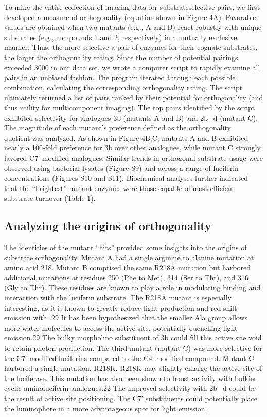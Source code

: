To mine the entire collection of imaging data for substrateselective
pairs, we first developed a measure of orthogonality
(equation shown in Figure 4A). Favorable values are obtained
when two mutants (e.g., A and B) react robustly with unique
substrates (e.g., compounds 1 and 2, respectively) in a mutually
exclusive manner. Thus, the more selective a pair of enzymes
for their cognate substrates, the larger the orthogonality rating.
Since the number of potential pairings exceeded 3000 in our
data set, we wrote a computer script to rapidly examine all pairs
in an unbiased fashion. The program iterated through each
possible combination, calculating the corresponding orthogonality
rating. The script ultimately returned a list of pairs ranked
by their potential for orthogonality (and thus utility for
multicomponent imaging).
The top pairs identified by the script exhibited selectivity for
analogues 3b (mutants A and B) and 2b−d (mutant C). The
magnitude of each mutant’s preferencedefined as the
orthogonality quotientwas analyzed. As shown in Figure
4B,C, mutants A and B exhibited nearly a 100-fold preference for 3b over other analogues, while mutant C strongly favored
C7′-modified analogues. Similar trends in orthogonal substrate
usage were observed using bacterial lysates (Figure S9) and
across a range of luciferin concentrations (Figures S10 and
S11). Biochemical analyses further indicated that the “brightest”
mutant enzymes were those capable of most efficient substrate
turnover (Table 1).

\subsection*{Analyzing the origins of orthogonality}

The identities
of the mutant “hits” provided some insights into the origins of
substrate orthogonality. Mutant A had a single arginine to
alanine mutation at amino acid 218. Mutant B comprised the
same R218A mutation but harbored additional mutations at
residues 250 (Phe to Met), 314 (Ser to Thr), and 316 (Gly to
Thr). These residues are known to play a role in modulating
binding and interaction with the luciferin substrate. The R218A
mutant is especially interesting, as it is known to greatly reduce
light production and red shift emission with \dluciferin{}.29 It has
been hypothesized that the smaller Ala group allows more
water molecules to access the active site, potentially quenching
light emission.29 The bulky morpholino substituent of 3b could
fill this active site void to retain photon production. The third
mutant (mutant C) was more selective for the C7′-modified
luciferins compared to the C4′-modified compound. Mutant C
harbored a single mutation, R218K. R218K may slightly enlarge
the active site of the luciferase. This mutation has also been
shown to boost activity with bulkier cyclic aminoluciferin
analogues.22 The improved selectivity with 2b−d could be the
result of active site positioning. The C7′ substituents could
potentially place the luminophore in a more advantageous spot
for light emission.

